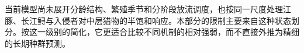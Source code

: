 当前模型尚未展开分龄结构、繁殖季节和分阶段放流调度，也按同一尺度处理江豚、长江鲟与入侵者对中层猎物的半饱和响应。本部分的限制主要来自这种状态划分。按这一级别的简化，它更适合比较不同机制的相对强弱，而不直接外推为精细的长期种群预测。
